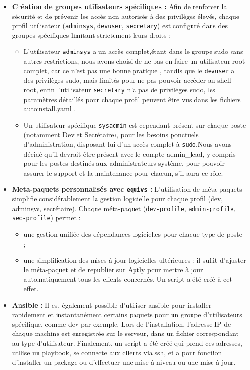 \documentclass[a4paper,12pt]{article}
\begin{document}
\begin{itemize}
\item \textbf{Création de groupes utilisateurs spécifiques :} 
Afin de renforcer la sécurité et de prévenir les accès non autorisés à des privilèges élevés, chaque profil utilisateur (\texttt{adminsys}, \texttt{devuser}, \texttt{secretary}) est configuré dans des groupes spécifiques limitant strictement leurs droits :
\begin{itemize}
    \item L'utilisateur \texttt{adminsys} a un accès complet,étant dans le groupe sudo sans autres restrictions, nous avons choisi de ne pas en faire un utilisateur root complet, car ce n'est pas une bonne pratique , tandis que le \texttt{devuser} a des privilèges sudo, mais limités pour ne pas pouvoir accéder au shell root, enfin l'utilisateur \texttt{secretary} n'a pas de privilèges sudo, les paramètres détaillés pour chaque profil peuvent être vus dans les fichiers autoinstall.yaml .
    
    \item Un utilisateur spécifique \texttt{sysadmin} est cependant présent sur chaque poste (notamment Dev et Secrétaire),  pour les besoins ponctuels d'administration, disposant lui d'un accès complet à \texttt{sudo}.Nous avons décidé qu'il devrait être présent avec le compte admin\_lead, y compris pour les postes destinés aux administrateurs système, pour pouvoir assurer le support et la maintenance pour chacun, s'il aura ce rôle.
    
\end{itemize}

\item \textbf{Meta-paquets personnalisés avec \texttt{equivs} :} 
L'utilisation de méta-paquets simplifie considérablement la gestion logicielle pour chaque profil (dev, adminsys, secrétaire). Chaque méta-paquet (\texttt{dev-profile}, \texttt{admin-profile}, \texttt{sec-profile}) permet :
\begin{itemize}
    \item une gestion unifiée des dépendances logicielles pour chaque type de poste ;
    \item une simplification des mises à jour logicielles ultérieures : il suffit d'ajuster le méta-paquet et de republier sur Aptly pour mettre à jour automatiquement tous les clients concernés. Un script a été créé à cet effet.
\end{itemize}

\item \textbf{Ansible :} 
Il est également possible d'utiliser ansible pour installer rapidement et instantanément certains paquets pour un groupe d'utilisateurs spécifique, comme dev par exemple. Lors de l'installation, l'adresse IP de chaque machine est enregistrée sur le serveur, dans un fichier correspondant au type d'utilisateur. Finalement, un script a été créé qui prend ces adresses, utilise un playbook, se connecte  aux clients via ssh, et a pour fonction d'installer un package ou d'effectuer une mise à niveau ou une mise à jour.



\end{itemize}
\end{document}
